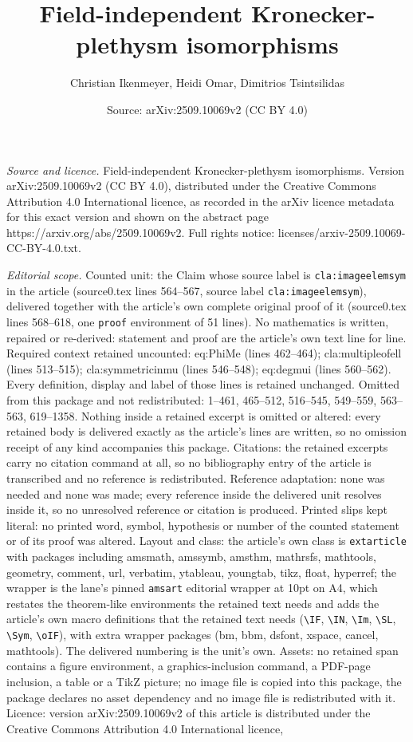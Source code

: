 \documentclass[10pt,a4paper]{amsart}
\title[Field-independent Kronecker-plethysm isomorphisms]{Field-independent Kronecker-plethysm isomorphisms}
\author{Christian Ikenmeyer, Heidi Omar, Dimitrios Tsintsilidas}
\date{Source: arXiv:2509.10069v2 (CC BY 4.0)}
\begin{document}
\maketitle

\noindent\emph{Source and licence.} Field-independent Kronecker-plethysm isomorphisms. Version arXiv:2509.10069v2 (CC BY 4.0), distributed under the Creative Commons Attribution 4.0 International licence, as recorded in the arXiv licence metadata for this exact version and shown on the abstract page https://arxiv.org/abs/2509.10069v2. Full rights notice: licenses/arxiv-2509.10069-CC-BY-4.0.txt.\par\smallskip

\noindent\textit{Editorial scope.} Counted unit: the Claim whose source label is \texttt{cla:imageelemsym} in the article (source0.tex lines 564--567, source label \texttt{cla:imageelemsym}), delivered together with the article's own complete original proof of it (source0.tex lines 568--618, one \texttt{proof} environment of 51 lines). No mathematics is written, repaired or re-derived: statement and proof are the article's own text line for line. Required context retained uncounted: eq:PhiMe (lines 462--464); cla:multipleofell (lines 513--515); cla:symmetricinmu (lines 546--548); eq:degmui (lines 560--562). Every definition, display and label of those lines is retained unchanged. Omitted from this package and not redistributed: 1--461, 465--512, 516--545, 549--559, 563--563, 619--1358. Nothing inside a retained excerpt is omitted or altered: every retained body is delivered exactly as the article's lines are written, so no omission receipt of any kind accompanies this package. Citations: the retained excerpts carry no citation command at all, so no bibliography entry of the article is transcribed and no reference is redistributed. Reference adaptation: none was needed and none was made; every reference inside the delivered unit resolves inside it, so no unresolved reference or citation is produced. Printed slips kept literal: no printed word, symbol, hypothesis or number of the counted statement or of its proof was altered. Layout and class: the article's own class is \texttt{extarticle} with packages including amsmath, amssymb, amsthm, mathrsfs, mathtools, geometry, comment, url, verbatim, ytableau, youngtab, tikz, float, hyperref; the wrapper is the lane's pinned \texttt{amsart} editorial wrapper at 10pt on A4, which restates the theorem-like environments the retained text needs and adds the article's own macro definitions that the retained text needs (\texttt{\textbackslash IF}, \texttt{\textbackslash IN}, \texttt{\textbackslash Im}, \texttt{\textbackslash SL}, \texttt{\textbackslash Sym}, \texttt{\textbackslash oIF}), with extra wrapper packages (bm, bbm, dsfont, xspace, cancel, mathtools). The delivered numbering is the unit's own. Assets: no retained span contains a figure environment, a graphics-inclusion command, a PDF-page inclusion, a table or a TikZ picture; no image file is copied into this package, the package declares no asset dependency and no image file is redistributed with it. Licence: version arXiv:2509.10069v2 of this article is distributed under the Creative Commons Attribution 4.0 International licence, 
\end{document}
